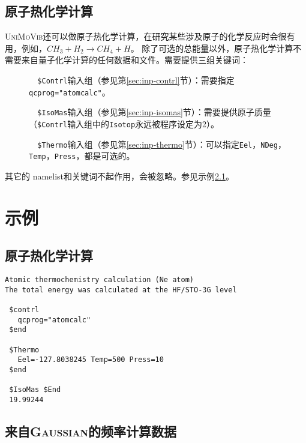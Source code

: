 \documentclass[12pt,a4paper,openany,twoside,cap,UTF8]{ctexbook}
\begin{document}
\section{原子热化学计算} \label{sec:inp-atom}

\textsc{UniMoVib}还可以做原子热化学计算，在研究某些涉及原子的化学反应时会很有用，例如，$CH_3 + H_2 \rightarrow CH_4 + H$。
除了可选的总能量以外，原子热化学计算不需要来自量子化学计算的任何数据和文件。需要提供三组关键词：

\begin{description}
\item[ ]\verb|  $Contrl|输入组（参见第\ref{sec:inp-contrl}节）：需要指定\verb|qcprog="atomcalc"|。
\item[ ]\verb|  $IsoMas|输入组（参见第\ref{sec:inp-isomas}节）：需要提供原子质量（\verb|$Contrl|输入组中的\verb|Isotop|永远被程序设定为2）。
\item[ ]\verb|  $Thermo|输入组（参见第\ref{sec:inp-thermo}节）：可以指定\verb|Eel|，\verb|NDeg|，\verb|Temp|，\verb|Press|，都是可选的。
\end{description}
其它的 namelist和关键词不起作用，会被忽略。参见示例\ref{sec:exp1}。

\chapter{示例} \label{part:examp}

\section{原子热化学计算} \label{sec:exp1}

\begin{colorboxed}[oval=false,boxcolor=blue!75!black,bgcolor=blue!5!white]
\ttfamily\footnotesize
\begin{lstlisting}
Atomic thermochemistry calculation (Ne atom)
The total energy was calculated at the HF/STO-3G level

 $contrl
   qcprog="atomcalc"
 $end

 $Thermo
   Eel=-127.8038245 Temp=500 Press=10
 $end

 $IsoMas $End
 19.99244
\end{lstlisting}\end{colorboxed}

\section{来自\textsc{Gaussian}的频率计算数据} \label{sec:exp2}
\end{document}
